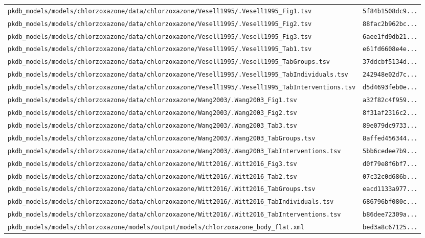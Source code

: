 \begin{longtable}{ll}
\texttt{pkdb\_models/models/chlorzoxazone/data/chlorzoxazone/Vesell1995/.Vesell1995\_Fig1.tsv} & \texttt{5f84b1508dc9...} \\
\texttt{pkdb\_models/models/chlorzoxazone/data/chlorzoxazone/Vesell1995/.Vesell1995\_Fig2.tsv} & \texttt{88fac2b962bc...} \\
\texttt{pkdb\_models/models/chlorzoxazone/data/chlorzoxazone/Vesell1995/.Vesell1995\_Fig3.tsv} & \texttt{6aee1fd9db21...} \\
\texttt{pkdb\_models/models/chlorzoxazone/data/chlorzoxazone/Vesell1995/.Vesell1995\_Tab1.tsv} & \texttt{e61fd6608e4e...} \\
\texttt{pkdb\_models/models/chlorzoxazone/data/chlorzoxazone/Vesell1995/.Vesell1995\_TabGroups.tsv} & \texttt{37ddcbf5134d...} \\
\texttt{pkdb\_models/models/chlorzoxazone/data/chlorzoxazone/Vesell1995/.Vesell1995\_TabIndividuals.tsv} & \texttt{242948e02d7c...} \\
\texttt{pkdb\_models/models/chlorzoxazone/data/chlorzoxazone/Vesell1995/.Vesell1995\_TabInterventions.tsv} & \texttt{d5d4693feb0e...} \\
\texttt{pkdb\_models/models/chlorzoxazone/data/chlorzoxazone/Wang2003/.Wang2003\_Fig1.tsv} & \texttt{a32f82c4f959...} \\
\texttt{pkdb\_models/models/chlorzoxazone/data/chlorzoxazone/Wang2003/.Wang2003\_Fig2.tsv} & \texttt{8f31af2316c2...} \\
\texttt{pkdb\_models/models/chlorzoxazone/data/chlorzoxazone/Wang2003/.Wang2003\_Tab3.tsv} & \texttt{89e079dc9733...} \\
\texttt{pkdb\_models/models/chlorzoxazone/data/chlorzoxazone/Wang2003/.Wang2003\_TabGroups.tsv} & \texttt{8affed456344...} \\
\texttt{pkdb\_models/models/chlorzoxazone/data/chlorzoxazone/Wang2003/.Wang2003\_TabInterventions.tsv} & \texttt{5bb6cedee7b9...} \\
\texttt{pkdb\_models/models/chlorzoxazone/data/chlorzoxazone/Witt2016/.Witt2016\_Fig3.tsv} & \texttt{d0f79e8f6bf7...} \\
\texttt{pkdb\_models/models/chlorzoxazone/data/chlorzoxazone/Witt2016/.Witt2016\_Tab2.tsv} & \texttt{07c32c0d686b...} \\
\texttt{pkdb\_models/models/chlorzoxazone/data/chlorzoxazone/Witt2016/.Witt2016\_TabGroups.tsv} & \texttt{eacd1133a977...} \\
\texttt{pkdb\_models/models/chlorzoxazone/data/chlorzoxazone/Witt2016/.Witt2016\_TabIndividuals.tsv} & \texttt{686796bf080c...} \\
\texttt{pkdb\_models/models/chlorzoxazone/data/chlorzoxazone/Witt2016/.Witt2016\_TabInterventions.tsv} & \texttt{b86dee72309a...} \\
\texttt{pkdb\_models/models/chlorzoxazone/models/output/models/chlorzoxazone\_body\_flat.xml} & \texttt{bed3a8c67125...} \\
\end{longtable}

